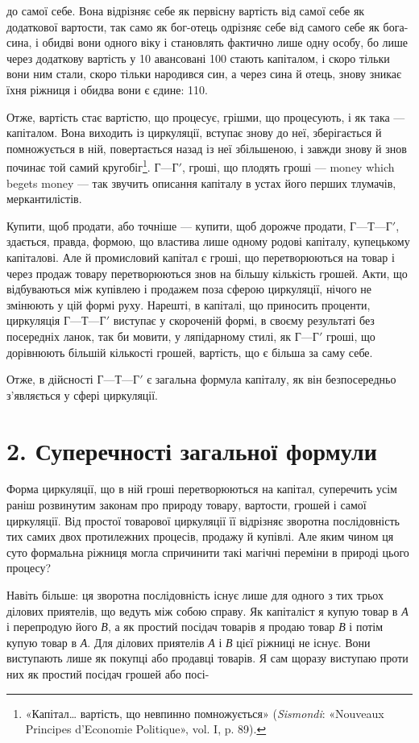 \parcont{}  %
до самої себе. Вона відрізняє себе як первісну вартість від самої
себе як додаткової вартости, так само як бог-отець одрізняє
себе від самого себе як бога-сина, і обидві вони одного віку
і становлять фактично лише одну особу, бо лише через додаткову
вартість у 10 авансовані 100
стають капіталом, і скоро тільки вони ним стали, скоро тільки
народився син, а через сина й отець, знову зникає їхня ріжниця
і обидва вони є єдине: 110.

Отже, вартість стає вартістю, що процесує, грішми, що процесують,
і як така — капіталом. Вона виходить із циркуляції,
вступає знову до неї, зберігається й помножується в ній, повертається
назад із неї збільшеною, і завжди знову й знов починає той
самий кругобіг\footnote{
«Капітал\dots{} вартість, що невпинно помножується» (\emph{Sismondi}: «Nouveaux
Principes d’Economie Politique», vol. I, p. 89).
}. $Г — Г'$, гроші, що плодять гроші — money which
begets money — так звучить описання капіталу в устах його
перших тлумачів, меркантилістів.

Купити, щоб продати, або точніше — купити, щоб дорожче
продати, $Г — Т — Г'$, здається, правда, формою, що властива
лише одному родові капіталу, купецькому капіталові. Але й
промисловий капітал є гроші, що перетворюються на товар і
через продаж товару перетворюються знов на більшу кількість
грошей. Акти, що відбуваються між купівлею і продажем поза
сферою циркуляції, нічого не змінюють у цій формі руху. Нарешті,
в капіталі, що приносить проценти, циркуляція $Г — Т — Г'$
виступає у скороченій формі, в своєму результаті без посередніх
ланок, так би мовити, у ляпідарному стилі, як $Г — Г'$ гроші, що
дорівнюють більшій кількості грошей, вартість, що є більша за
саму себе.

Отже, в дійсності $Г — Т — Г'$ є загальна формула капіталу,
як він безпосередньо з’являється у сфері циркуляції.

\section*{2. Суперечності загальної формули}

Форма циркуляції, що в ній гроші перетворюються на капітал,
суперечить усім раніш розвинутим законам про природу товару,
вартости, грошей і самої циркуляції. Від простої товарової
циркуляції її відрізняє зворотна послідовність тих самих двох
протилежних процесів, продажу й купівлі. Але яким чином
ця суто формальна ріжниця могла спричинити такі магічні переміни
в природі цього процесу?

Навіть більше: ця зворотна послідовність існує лише для
одного з тих трьох ділових приятелів, що ведуть між собою
справу. Як капіталіст я купую товар в \emph{А} і перепродую його \emph{В},
а як простий посідач товарів я продаю товар \emph{В} і потім купую
товар в \emph{А}. Для ділових приятелів \emph{А} і \emph{В} цієї ріжниці не існує.
Вони виступають лише як покупці або продавці товарів. Я сам
щоразу виступаю проти них як простий посідач грошей або посі-
\parbreak{}  %
